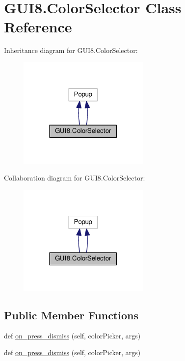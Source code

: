 \hypertarget{classGUI8_1_1ColorSelector}{}\section{G\+U\+I8.\+Color\+Selector Class Reference}
\label{classGUI8_1_1ColorSelector}


Inheritance diagram for G\+U\+I8.\+Color\+Selector\+:
\nopagebreak
\begin{figure}[H]
\begin{center}
\leavevmode
\includegraphics[width=182pt]{classGUI8_1_1ColorSelector__inherit__graph}
\end{center}
\end{figure}


Collaboration diagram for G\+U\+I8.\+Color\+Selector\+:
\nopagebreak
\begin{figure}[H]
\begin{center}
\leavevmode
\includegraphics[width=182pt]{classGUI8_1_1ColorSelector__coll__graph}
\end{center}
\end{figure}
\subsection*{Public Member Functions}
\begin{DoxyCompactItemize}
\item 
def \hyperlink{classGUI8_1_1ColorSelector_af1c3dc2b6ada3189e0d69d7a16c347a7}{on\+\_\+press\+\_\+dismiss} (self, color\+Picker, args)
\item 
def \hyperlink{classGUI8_1_1ColorSelector_af1c3dc2b6ada3189e0d69d7a16c347a7}{on\+\_\+press\+\_\+dismiss} (self, color\+Picker, args)
\end{DoxyCompactItemize}
